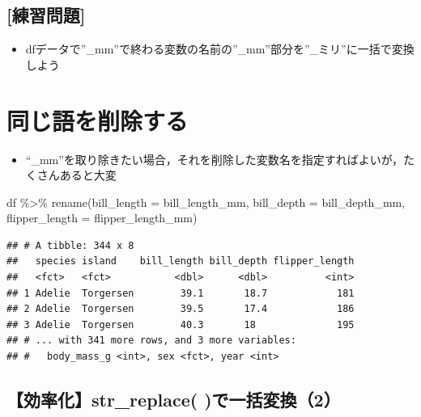 \documentclass[
  xelatex,ja=standard, b5paper]{bxjsbook}
\newenvironment{Shaded}{\begin{snugshade}}{\end{snugshade}}
\newcommand{\AttributeTok}[1]{\textcolor[rgb]{0.77,0.63,0.00}{#1}}
\newcommand{\FunctionTok}[1]{\textcolor[rgb]{0.00,0.00,0.00}{#1}}
\newcommand{\NormalTok}[1]{#1}
\newcommand{\SpecialCharTok}[1]{\textcolor[rgb]{0.00,0.00,0.00}{#1}}
\providecommand{\tightlist}{%
  \setlength{\itemsep}{0pt}\setlength{\parskip}{0pt}}
\begin{document}
\hypertarget{ux7df4ux7fd2ux554fux984c-3}{%
\subsection{{[}練習問題{]}}\label{ux7df4ux7fd2ux554fux984c-3}}

\begin{itemize}
\tightlist
\item
  dfデータで''\_mm''で終わる変数の名前の''\_mm''部分を''\_ミリ''に一括で変換しよう
\end{itemize}

\hypertarget{rename-remove}{%
\section{同じ語を削除する}\label{rename-remove}}

\begin{itemize}
\tightlist
\item
  ``\_mm''を取り除きたい場合，それを削除した変数名を指定すればよいが，たくさんあると大変
\end{itemize}

\begin{Shaded}
\begin{Highlighting}[]
\NormalTok{df }\SpecialCharTok{\%\textgreater{}\%} 
  \FunctionTok{rename}\NormalTok{(}\AttributeTok{bill\_length =}\NormalTok{ bill\_length\_mm,}
         \AttributeTok{bill\_depth  =}\NormalTok{ bill\_depth\_mm,}
         \AttributeTok{flipper\_length =}\NormalTok{ flipper\_length\_mm)}
\end{Highlighting}
\end{Shaded}

\begin{verbatim}
## # A tibble: 344 x 8
##   species island    bill_length bill_depth flipper_length
##   <fct>   <fct>           <dbl>      <dbl>          <int>
## 1 Adelie  Torgersen        39.1       18.7            181
## 2 Adelie  Torgersen        39.5       17.4            186
## 3 Adelie  Torgersen        40.3       18              195
## # ... with 341 more rows, and 3 more variables:
## #   body_mass_g <int>, sex <fct>, year <int>
\end{verbatim}

\hypertarget{rename-strreplace2}{%
\subsection{【効率化】str\_replace( )で一括変換（2）}\label{rename-strreplace2}}
\end{document}
